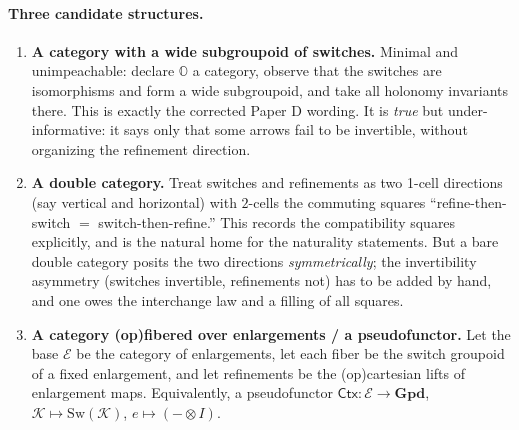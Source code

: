\documentclass[11pt]{article}
\theoremstyle{definition}
\theoremstyle{remark}
\newcommand{\K}{\mathcal K}
\newcommand{\Ecat}{\mathcal E}
\newcommand{\Oc}{\mathbb O}
\newcommand{\Sw}{\mathrm{Sw}}
\newcommand{\Ctx}{\mathsf{Ctx}}
\newcommand{\Gpd}{\mathbf{Gpd}}
\begin{document}
\paragraph{Three candidate structures.}
\begin{enumerate}[label=(\arabic*),leftmargin=2em]
\item \textbf{A category with a wide subgroupoid of switches.} Minimal and
unimpeachable: declare $\Oc$ a category, observe that the switches are isomorphisms
and form a wide subgroupoid, and take all holonomy invariants there. This is exactly
the corrected Paper D wording. It is \emph{true} but under-informative: it says only
that some arrows fail to be invertible, without organizing the refinement direction.
\item \textbf{A double category.} Treat switches and refinements as two 1-cell
directions (say vertical and horizontal) with $2$-cells the commuting squares
``refine-then-switch $=$ switch-then-refine.'' This records the compatibility squares
explicitly, and is the natural home for the naturality statements. But a bare double
category posits the two directions \emph{symmetrically}; the invertibility asymmetry
(switches invertible, refinements not) has to be added by hand, and one owes the
interchange law and a filling of all squares.
\item \textbf{A category (op)fibered over enlargements / a pseudofunctor.} Let the
base $\Ecat$ be the category of enlargements, let each fiber be the switch groupoid of
a fixed enlargement, and let refinements be the (op)cartesian lifts of enlargement
maps. Equivalently, a pseudofunctor $\Ctx:\Ecat\to\Gpd$, $\K\mapsto\Sw(\K)$,
$e\mapsto(-\otimes I)$.
\end{enumerate}
\end{document}
